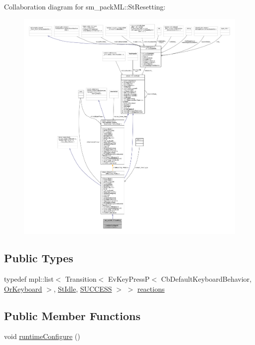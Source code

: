 Collaboration diagram for sm\+\_\+pack\+ML\+:\+:St\+Resetting\+:
\nopagebreak
\begin{figure}[H]
\begin{center}
\leavevmode
\includegraphics[width=350pt]{structsm__packML_1_1StResetting__coll__graph}
\end{center}
\end{figure}
\subsection*{Public Types}
\begin{DoxyCompactItemize}
\item 
typedef mpl\+::list$<$ Transition$<$ Ev\+Key\+PressP$<$ Cb\+Default\+Keyboard\+Behavior, \hyperlink{classsm__packML_1_1OrKeyboard}{Or\+Keyboard} $>$, \hyperlink{structsm__packML_1_1StIdle}{St\+Idle}, \hyperlink{classSUCCESS}{S\+U\+C\+C\+E\+SS} $>$ $>$ \hyperlink{structsm__packML_1_1StResetting_adb5a25459b59cd84a9912fde9282395c}{reactions}
\end{DoxyCompactItemize}
\subsection*{Public Member Functions}
\begin{DoxyCompactItemize}
\item 
void \hyperlink{structsm__packML_1_1StResetting_a994a59cfdc6092d4a2652479305f7227}{runtime\+Configure} ()
\end{DoxyCompactItemize}
